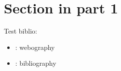 
\section{Section in part 1}

Test biblio:

\begin{itemize}
  \item \cite{frwiki:208904381}: webography
  \item \cite{unruh1994prime}: bibliography
\end{itemize}
